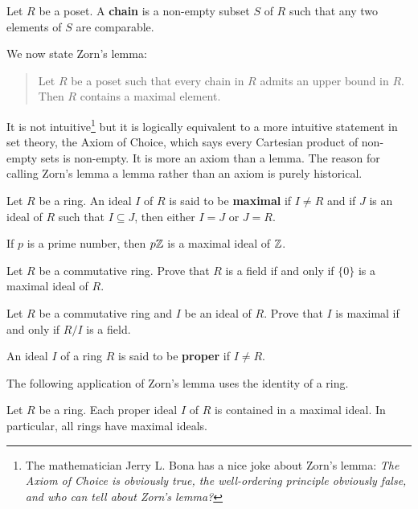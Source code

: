 \begin{definition}
    Let $R$ be a poset. A \textbf{chain} is a non-empty subset $S$ of $R$ such that
    any two elements of $S$ are comparable. 
\end{definition}

We now state Zorn's lemma:

\begin{quote}
Let $R$ be a poset such that 
every chain in $R$ admits an upper bound in $R$. 
Then $R$ contains a maximal element. 
\end{quote}

It is not intuitive\footnote{The mathematician
Jerry L. Bona has a nice joke about Zorn's lemma: 
\emph{The Axiom of Choice is obviously true, 
the well-ordering principle obviously false, and who can tell about Zorn's lemma?}}
but it is logically equivalent to a more 
intuitive statement in set theory, the Axiom of Choice, 
which says every Cartesian product of non-empty sets is non-empty. 
It is more an axiom than a lemma. 
The reason for calling Zorn’s lemma a lemma rather 
than an axiom is purely historical. 

\begin{definition}
	Let $R$ be a ring. An ideal $I$ of $R$ is said to be \textbf{maximal}
	if $I\ne R$ and if $J$ is an ideal of $R$ such that $I\subseteq J$, then 
	either $I=J$ or $J=R$. 
\end{definition}

If $p$ is a prime number, then $p\mathbb{Z}$ is a maximal ideal of $\mathbb{Z}$.

\begin{exercise}
Let $R$ be a commutative ring. Prove that $R$ is a 
field if and only if $\{0\}$ is a maximal ideal of $R$. 	
\end{exercise}

\begin{exercise}
Let $R$ be a commutative ring and $I$ be an ideal of $R$. Prove that $I$ is maximal
if and only if $R/I$ is a field.  	
\end{exercise}

An ideal $I$ of a ring $R$ is said to be \textbf{proper}
if $I\ne R$. 

The following application of Zorn's lemma uses 
the identity of a ring.

\begin{theorem}[Krull]
	Let $R$ be a ring. Each proper ideal $I$ of $R$ 
	is contained in a maximal ideal. 
	In particular, all rings have maximal ideals. 	
\end{theorem}

